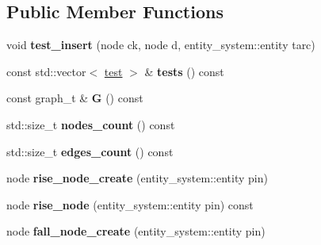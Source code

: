 \subsection*{Public Member Functions}
\begin{DoxyCompactItemize}
\item 
\hypertarget{classophidian_1_1timing_1_1graph_af3a383ec28e19edbf516b2cd5ee629dc}{void {\bfseries test\-\_\-insert} (node ck, node d, entity\-\_\-system\-::entity tarc)}\label{classophidian_1_1timing_1_1graph_af3a383ec28e19edbf516b2cd5ee629dc}

\item 
\hypertarget{classophidian_1_1timing_1_1graph_af75b137f9e0d054b63d161dd5775059a}{const std\-::vector$<$ \hyperlink{structophidian_1_1timing_1_1test}{test} $>$ \& {\bfseries tests} () const }\label{classophidian_1_1timing_1_1graph_af75b137f9e0d054b63d161dd5775059a}

\item 
\hypertarget{classophidian_1_1timing_1_1graph_a4dc7bafe73cbd78f86fc2948fbd058cd}{const graph\-\_\-t \& {\bfseries G} () const }\label{classophidian_1_1timing_1_1graph_a4dc7bafe73cbd78f86fc2948fbd058cd}

\item 
\hypertarget{classophidian_1_1timing_1_1graph_a62e7abd9da49e8a6c0d1e6bffcc30feb}{std\-::size\-\_\-t {\bfseries nodes\-\_\-count} () const }\label{classophidian_1_1timing_1_1graph_a62e7abd9da49e8a6c0d1e6bffcc30feb}

\item 
\hypertarget{classophidian_1_1timing_1_1graph_a069f0377f0a51df175b85b17cb69e8d2}{std\-::size\-\_\-t {\bfseries edges\-\_\-count} () const }\label{classophidian_1_1timing_1_1graph_a069f0377f0a51df175b85b17cb69e8d2}

\item 
\hypertarget{classophidian_1_1timing_1_1graph_a0b2ef1bac264ce316a4c00e337d950ab}{node {\bfseries rise\-\_\-node\-\_\-create} (entity\-\_\-system\-::entity pin)}\label{classophidian_1_1timing_1_1graph_a0b2ef1bac264ce316a4c00e337d950ab}

\item 
\hypertarget{classophidian_1_1timing_1_1graph_ab2b9f75653b07675e76d44a8caa8ad47}{node {\bfseries rise\-\_\-node} (entity\-\_\-system\-::entity pin) const }\label{classophidian_1_1timing_1_1graph_ab2b9f75653b07675e76d44a8caa8ad47}

\item 
\hypertarget{classophidian_1_1timing_1_1graph_a1a00892ad0b95af0942d87f0aef142a9}{node {\bfseries fall\-\_\-node\-\_\-create} (entity\-\_\-system\-::entity pin)}\label{classophidian_1_1timing_1_1graph_a1a00892ad0b95af0942d87f0aef142a9}


\end{DoxyCompactItemize}
